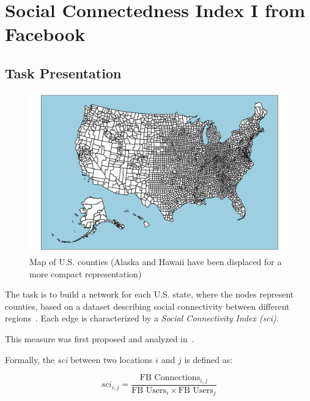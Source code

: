 \chapter{Social Connectedness Index I from Facebook}

\section{Task Presentation}

\begin{figure}[h]
    \centering
    \begin{minipage}[c]{0.7\textwidth}
        \includegraphics[width=\textwidth]{images/task1/U.S. counties.png}
    \end{minipage}%
    \begin{minipage}[c]{0.4\textwidth}
        \caption{Map of U.S. counties (Alaska and Hawaii have been displaced for a more compact representation)}
        \label{fig:us_counties}
    \end{minipage}
\end{figure}

The task is to build a network for each U.S. state, where the nodes represent counties, based on a dataset describing social connectivity between different regions~\cite{sciFacebook}. Each edge is characterized by a \textsl{Social Connectivity Index (sci)}.

This measure was first proposed and analyzed in~\cite{bai2018sci}.

Formally, the \textsl{sci} between two locations $i$ and $j$ is defined as:

\begin{equation}
    sci_{i,j} = \frac{\text{FB Connections}_{i,j}}{\text{FB Users}_i \times \text{FB Users}_j}
\end{equation}

